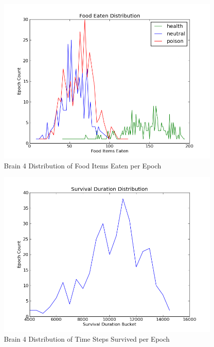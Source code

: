\documentclass[a4paper,11pt]{article}
\begin{document}
\begin{figure}
\begin{center}
  \includegraphics[scale=1.0]{img/brain4/foodGauss-h37.79-n23.82-p30.68.png}
  \caption{Brain 4 Distribution of Food Items Eaten per Epoch}
  \label{fig:b4food}
\end{center}
\end{figure}

\begin{figure}
\begin{center}
  \includegraphics[scale=1.0]{img/brain4/survivalGauss-3172.14.png}
  \caption{Brain 4 Distribution of Time Steps Survived per Epoch}
  \label{fig:b4survive}
\end{center}
\end{figure}
\end{document}
